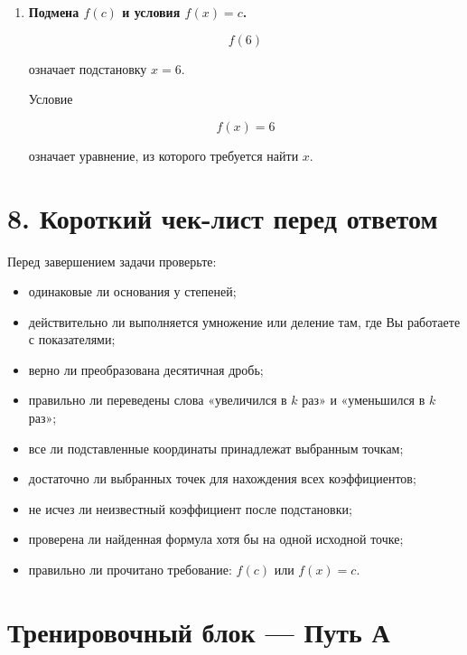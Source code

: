 \documentclass[a4paper,12pt]{article}
\newcommand{\important}[1]{\textbf{\color{darkaccent}#1}}
\begin{document}
\begin{enumerate}
\[
(x_0;y_0)
\]

первая координата --- аргумент \(x_0\), вторая --- значение функции:

\[
y_0=f(x_0).
\]

\item
\important{Подмена \(f(c)\) и условия \(f(x)=c\).}

\[
f(6)
\]

означает подстановку \(x=6\).

Условие

\[
f(x)=6
\]

означает уравнение, из которого требуется найти \(x\).

\end{enumerate}

\section{8. Короткий чек-лист перед ответом}

Перед завершением задачи проверьте:

\begin{itemize}
    \item одинаковые ли основания у степеней;
    \item действительно ли выполняется умножение или деление там, где Вы работаете с показателями;
    \item верно ли преобразована десятичная дробь;
    \item правильно ли переведены слова «увеличился в \(k\) раз» и «уменьшился в \(k\) раз»;
    \item все ли подставленные координаты принадлежат выбранным точкам;
    \item достаточно ли выбранных точек для нахождения всех коэффициентов;
    \item не исчез ли неизвестный коэффициент после подстановки;
    \item проверена ли найденная формула хотя бы на одной исходной точке;
    \item правильно ли прочитано требование: \(f(c)\) или \(f(x)=c\).
\end{itemize}

\clearpage

\section*{Тренировочный блок — Путь А}
\end{document}

